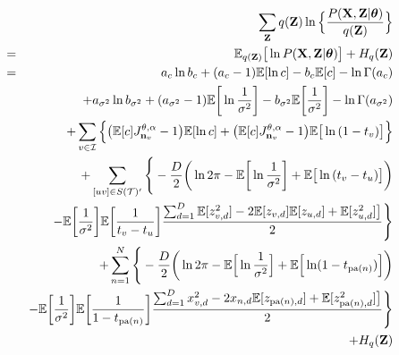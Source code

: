 \documentclass{article}
\begin{document}
	\begin{eqnarray}
		& & \sum_\bold{Z}q(\bold{Z})\ln \Big\{ \frac{P(\bold{X}, \bold{Z}| \boldsymbol{\theta})}{q(\bold{Z})} \Big\} \nonumber \\
		&=& \mathbb{E}_{q(\bold{Z})} \big[ \ln{P(\bold{X}, \bold{Z}|\boldsymbol{\theta})} \big]	+ H_{q}(\bold{Z})
		\nonumber \\
		&=& a_c\ln{b_c} + (a_c - 1)\mathbb{E}[\ln{c}] - b_c\mathbb{E}[c] -\ln{\Gamma(a_c)} \nonumber \\
		& & + a_{\sigma^2}\ln{b_{\sigma^2}} + (a_{\sigma^2} - 1)\mathbb{E}\bigg[ \ln{\frac{1}{\sigma^2}} \bigg] - b_{\sigma^2}\mathbb{E}\bigg[ \frac{1}{\sigma^2} \bigg] - \ln{\Gamma(a_{\sigma^2})} \nonumber \\
		& & + \sum_{v \in \mathcal{I}} \Big\{ \big( \mathbb{E}[c]J^{\theta, \alpha}_{\bold{n}_v} - 1 \big) \mathbb{E}[\ln{c}] + \big( \mathbb{E}[c]J^{\theta, \alpha}_{\bold{n}_v} - 1 \big)\mathbb{E} \big[ \ln{(1 - t_v)} \big] \Big\} \nonumber \\
		& & + \sum_{[uv] \in S(\mathcal{T})'} \Bigg\{-\frac{D}{2} \bigg(\ln{2\pi} - \mathbb{E}\bigg[ \ln{\frac{1}{\sigma^2}} \bigg] + \mathbb{E} \big[ \ln{(t_v - t_u) \big]} \bigg) \nonumber \\
		& & - \mathbb{E}\bigg[ \frac{1}{\sigma^2} \bigg] \mathbb{E}\bigg[ \frac{1}{t_v - t_u} \bigg] \frac{ \sum^D_{d=1} \mathbb{E} [z_{v,d}^2] - 2\mathbb{E}[z_{v,d}]\mathbb{E}[z_{u,d}] + \mathbb{E}[z_{u,d}^2] \big]}{2} \Bigg\} \nonumber \\
	 	& & + \sum^N_{n=1} \Bigg\{-\frac{D}{2} \bigg( \ln{2\pi} - \mathbb{E} \Big[ \ln{\frac{1}{\sigma^2}} \Big] + \mathbb{E} \Big[ \ln(1 - t_{\textrm{pa}(n)}) \Big] \bigg) \nonumber \\
	 	& & - \mathbb{E}\bigg[ \frac{1}{\sigma^2} \bigg] \mathbb{E}\bigg[ \frac{1}{1 - t_{\textrm{pa}(n)}} \bigg] \frac{\sum^D_{d=1} x^2_{v,d} - 2x_{n, d}\mathbb{E}[z_{\textrm{pa}(n), d}] + \mathbb{E}[z^2_{\textrm{pa}(n), d}] \big]}{2} \Bigg\} \nonumber \\
	 	& & + H_q(\bold{Z})
	\end{eqnarray}
\end{document}

